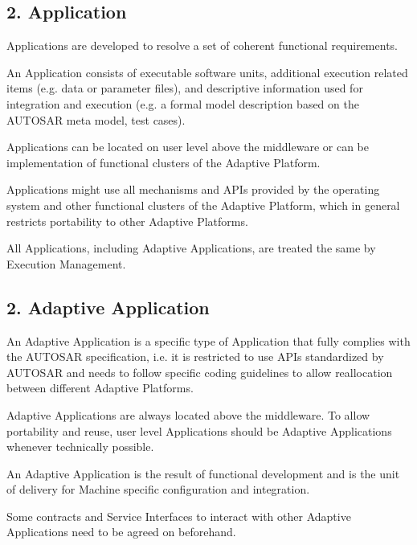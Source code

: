 \subsection*{2. {\bfseries Application}}


\begin{DoxyItemize}
\item Applications are developed to resolve a set of coherent functional requirements.
\item An Application consists of executable software units, additional execution related items (e.\+g. data or parameter files), and descriptive information used for integration and execution (e.\+g. a formal model description based on the A\+U\+T\+O\+S\+AR meta model, test cases).
\item Applications can be located on user level above the middleware or can be implementation of functional clusters of the Adaptive Platform.
\item Applications might use all mechanisms and A\+P\+Is provided by the operating system and other functional clusters of the Adaptive Platform, which in general restricts portability to other Adaptive Platforms.
\item All Applications, including Adaptive Applications, are treated the same by Execution Management.
\end{DoxyItemize}

\subsection*{2. {\bfseries Adaptive Application}}


\begin{DoxyItemize}
\item An Adaptive Application is a specific type of Application that fully complies with the A\+U\+T\+O\+S\+AR specification, i.\+e. it is restricted to use A\+P\+Is standardized by A\+U\+T\+O\+S\+AR and needs to follow specific coding guidelines to allow reallocation between different Adaptive Platforms.
\item Adaptive Applications are always located above the middleware. To allow portability and reuse, user level Applications should be Adaptive Applications whenever technically possible.
\item An Adaptive Application is the result of functional development and is the unit of delivery for Machine specific configuration and integration.
\item Some contracts and Service Interfaces to interact with other Adaptive Applications need to be agreed on beforehand.
\end{DoxyItemize}

